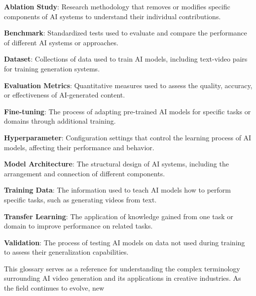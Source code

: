 \textbf{Ablation Study}: Research methodology that removes or modifies specific components of AI systems to understand their individual contributions.

\textbf{Benchmark}: Standardized tests used to evaluate and compare the performance of different AI systems or approaches.

\textbf{Dataset}: Collections of data used to train AI models, including text-video pairs for training generation systems.

\textbf{Evaluation Metrics}: Quantitative measures used to assess the quality, accuracy, or effectiveness of AI-generated content.

\textbf{Fine-tuning}: The process of adapting pre-trained AI models for specific tasks or domains through additional training.

\textbf{Hyperparameter}: Configuration settings that control the learning process of AI models, affecting their performance and behavior.

\textbf{Model Architecture}: The structural design of AI systems, including the arrangement and connection of different components.

\textbf{Training Data}: The information used to teach AI models how to perform specific tasks, such as generating videos from text.

\textbf{Transfer Learning}: The application of knowledge gained from one task or domain to improve performance on related tasks.

\textbf{Validation}: The process of testing AI models on data not used during training to assess their generalization capabilities.

This glossary serves as a reference for understanding the complex terminology surrounding AI video generation and its applications in creative industries. As the field continues to evolve, new